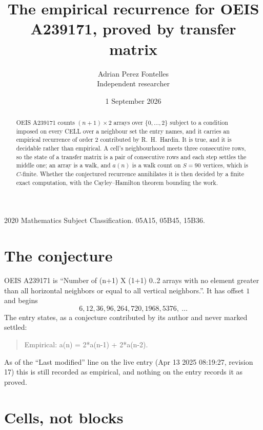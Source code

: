 \documentclass[11pt,a4paper]{article}
\title{The empirical recurrence for OEIS A239171, proved by transfer matrix}
\author{Adrian Perez Fontelles\\ \small Independent researcher}
\date{1 September 2026}
\theoremstyle{plain}
\theoremstyle{definition}
\begin{document}
\maketitle

\begin{abstract}
OEIS A239171 counts $(n+1)\times2$ arrays over $\{0,\dots,2\}$ subject to a condition imposed on
every CELL over a neighbour set the entry names, and it carries an empirical recurrence of
order $2$ contributed by R.~H.~Hardin. It is true, and it is decidable rather than
empirical. A cell's neighbourhood meets three consecutive rows, so the state of a transfer
matrix is a pair of consecutive rows and each step settles the middle one; an array is a
walk, and $a(n)$ is a walk count on $S=90$ vertices, which is $C$-finite. Whether the
conjectured recurrence annihilates it is then decided by a finite exact computation, with the
Cayley--Hamilton theorem bounding the work.
\end{abstract}

\noindent\small 2020 Mathematics Subject Classification. 05A15, 05B45, 15B36.\normalsize

\section{The conjecture}

OEIS A239171 is ``Number of (n+1) X (1+1) 0..2 arrays with no element greater than all horizontal neighbors or equal to all vertical neighbors.''. It has offset $1$ and begins
\[
6, 12, 36, 96, 264, 720, 1968, 5376,\ \dots
\]
The entry states, as a conjecture contributed by its author and never marked settled:
\begin{quote}
Empirical: a(n) = 2*a(n-1) + 2*a(n-2).
\end{quote}
As of the ``Last modified'' line on the live entry (Apr 13 2025 08:19:27, revision 17) this is still
recorded as empirical, and nothing on the entry records it as proved.

\section{Cells, not blocks}
\end{document}

